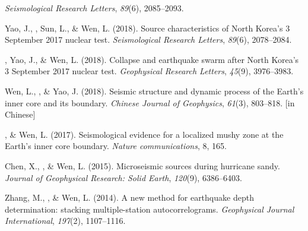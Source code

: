 \begin{etaremune}
    \textit{Seismological Research Letters}, \textit{89}(6), 2085--2093.
\item
    Yao, J., \Tian\CF, Sun, L., \& Wen, L. (2018).
	Source characteristics of North Korea's 3 September 2017 nuclear test.
    \textit{Seismological Research Letters}, \textit{89}(6), 2078--2084.
\item
    \Tian\CS, Yao, J., \& Wen, L. (2018).
    Collapse and earthquake swarm after North Korea's 3 September 2017 nuclear test.
    \textit{Geophysical Research Letters}, \textit{45}(9), 3976--3983.
\item
    Wen, L., \Tian, \& Yao, J. (2018).
    Seismic structure and dynamic process of the Earth's inner core and its boundary.
    \textit{Chinese Journal of Geophysics}, \textit{61}(3), 803--818.
     [in Chinese]
\item
    \Tian, \& Wen, L. (2017).
    Seismological evidence for a localized mushy zone at the Earth's inner core boundary.
    \textit{Nature communications}, 8, 165.
\item
    Chen, X., \Tian, \& Wen, L. (2015).
    Microseismic sources during hurricane sandy.
    \textit{Journal of Geophysical Research: Solid Earth}, \textit{120}(9), 6386--6403.
\item Zhang, M., \Tian, \& Wen, L. (2014).
    A new method for earthquake depth determination: stacking multiple-station autocorrelograms.
    \textit{Geophysical Journal International}, \textit{197}(2), 1107--1116.
\end{etaremune}



